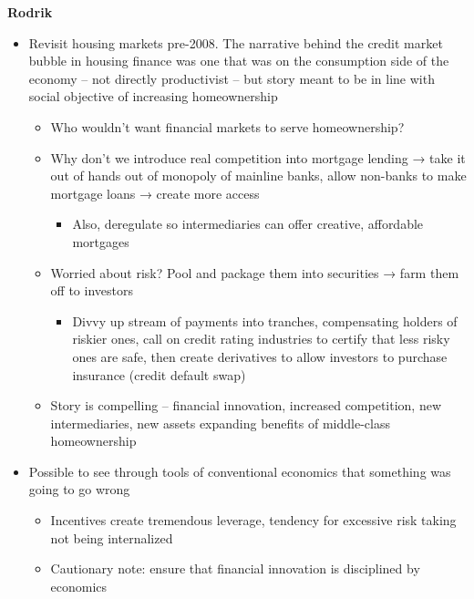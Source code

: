\textbf{Rodrik}

\begin{itemize}
\tightlist
\item
  Revisit housing markets pre-2008. The narrative behind the credit
  market bubble in housing finance was one that was on the consumption
  side of the economy -- not directly productivist -- but story meant to
  be in line with social objective of increasing homeownership

  \begin{itemize}
  \tightlist
  \item
    Who wouldn't want financial markets to serve homeownership?
  \item
    Why don't we introduce real competition into mortgage lending → take
    it out of hands out of monopoly of mainline banks, allow non-banks
    to make mortgage loans → create more access

    \begin{itemize}
    \tightlist
    \item
      Also, deregulate so intermediaries can offer creative, affordable
      mortgages
    \end{itemize}
  \item
    Worried about risk? Pool and package them into securities → farm
    them off to investors

    \begin{itemize}
    \tightlist
    \item
      Divvy up stream of payments into tranches, compensating holders of
      riskier ones, call on credit rating industries to certify that
      less risky ones are safe, then create derivatives to allow
      investors to purchase insurance (credit default swap)
    \end{itemize}
  \item
    Story is compelling -- financial innovation, increased competition,
    new intermediaries, new assets expanding benefits of middle-class
    homeownership
  \end{itemize}
\item
  Possible to see through tools of conventional economics that something
  was going to go wrong

  \begin{itemize}
  \tightlist
  \item
    Incentives create tremendous leverage, tendency for excessive risk
    taking not being internalized
  \item
    Cautionary note: ensure that financial innovation is disciplined by
    economics
  \end{itemize}
\end{itemize}

